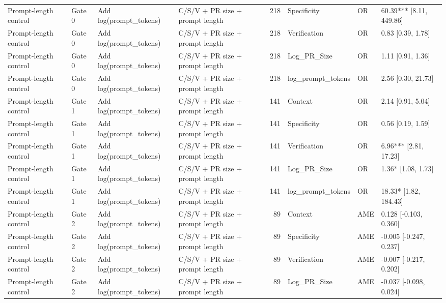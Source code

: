 \begin{table}
\begin{tabular}{llllrlll}
Prompt-length control & Gate 0 & Add log(prompt_tokens) & C/S/V + PR size + prompt length & 218 & Specificity & OR & 60.39*** [8.11, 449.86] \\
Prompt-length control & Gate 0 & Add log(prompt_tokens) & C/S/V + PR size + prompt length & 218 & Verification & OR & 0.83 [0.39, 1.78] \\
Prompt-length control & Gate 0 & Add log(prompt_tokens) & C/S/V + PR size + prompt length & 218 & Log_PR_Size & OR & 1.11 [0.91, 1.36] \\
Prompt-length control & Gate 0 & Add log(prompt_tokens) & C/S/V + PR size + prompt length & 218 & log_prompt_tokens & OR & 2.56 [0.30, 21.73] \\
Prompt-length control & Gate 1 & Add log(prompt_tokens) & C/S/V + PR size + prompt length & 141 & Context & OR & 2.14 [0.91, 5.04] \\
Prompt-length control & Gate 1 & Add log(prompt_tokens) & C/S/V + PR size + prompt length & 141 & Specificity & OR & 0.56 [0.19, 1.59] \\
Prompt-length control & Gate 1 & Add log(prompt_tokens) & C/S/V + PR size + prompt length & 141 & Verification & OR & 6.96*** [2.81, 17.23] \\
Prompt-length control & Gate 1 & Add log(prompt_tokens) & C/S/V + PR size + prompt length & 141 & Log_PR_Size & OR & 1.36* [1.08, 1.73] \\
Prompt-length control & Gate 1 & Add log(prompt_tokens) & C/S/V + PR size + prompt length & 141 & log_prompt_tokens & OR & 18.33* [1.82, 184.43] \\
Prompt-length control & Gate 2 & Add log(prompt_tokens) & C/S/V + PR size + prompt length & 89 & Context & AME & 0.128 [-0.103, 0.360] \\
Prompt-length control & Gate 2 & Add log(prompt_tokens) & C/S/V + PR size + prompt length & 89 & Specificity & AME & -0.005 [-0.247, 0.237] \\
Prompt-length control & Gate 2 & Add log(prompt_tokens) & C/S/V + PR size + prompt length & 89 & Verification & AME & -0.007 [-0.217, 0.202] \\
Prompt-length control & Gate 2 & Add log(prompt_tokens) & C/S/V + PR size + prompt length & 89 & Log_PR_Size & AME & -0.037 [-0.098, 0.024] \\
\bottomrule
\end{tabular}
\end{table}
